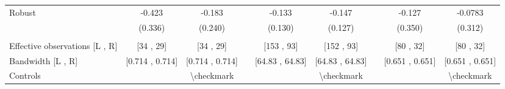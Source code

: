 \begin{tabular}{lcccccccc}
Robust & -0.423 & -0.183 &       & -0.133 & -0.147 &       & -0.127 & -0.0783 \\
      & (0.336) & (0.240) &       & (0.130) & (0.127) &       & (0.350) & (0.312) \\
      &       &       &       &       &       &       &       &  \\
\midrule
Effective observations [L , R] & [34 ,  29] & [34 ,  29] &       & [153 ,  93] & [152 ,  93] &       & [80 ,  32] & [80 ,  32] \\
Bandwidth [L , R] & [0.714 ,  0.714] & [0.714 ,  0.714] &       & [64.83 ,  64.83] & [64.83 ,  64.83] &       & [0.651 ,  0.651] & [0.651 ,  0.651] \\
Controls &       & \textbackslash{}checkmark &       &       & \textbackslash{}checkmark &       &       & \textbackslash{}checkmark \\
\bottomrule
\bottomrule
\end{tabular}%
